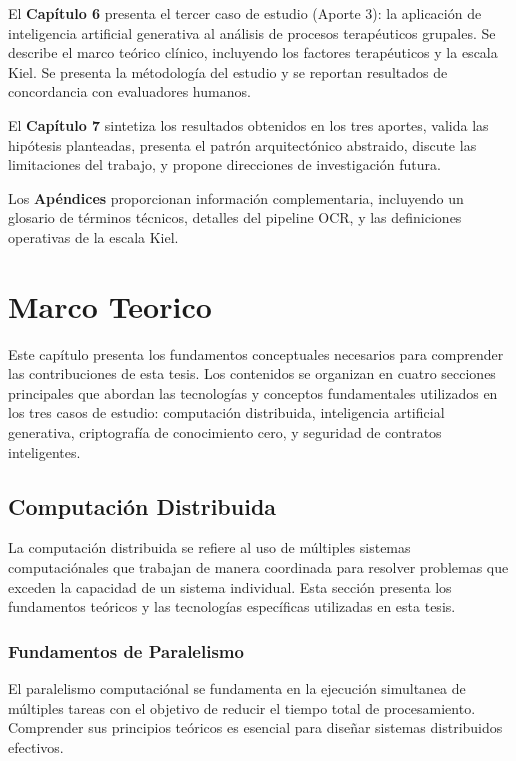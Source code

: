 \documentclass[12pt,a4paper,twoside]{book}
\begin{document}
El \textbf{Capítulo 6} presenta el tercer caso de estudio (Aporte 3): la aplicación de inteligencia artificial generativa al análisis de procesos terapéuticos grupales. Se describe el marco teórico clínico, incluyendo los factores terapéuticos y la escala Kiel. Se presenta la métodología del estudio y se reportan resultados de concordancia con evaluadores humanos.

El \textbf{Capítulo 7} sintetiza los resultados obtenidos en los tres aportes, valida las hipótesis planteadas, presenta el patrón arquitectónico abstraido, discute las limitaciones del trabajo, y propone direcciones de investigación futura.

Los \textbf{Apéndices} proporcionan información complementaria, incluyendo un glosario de términos técnicos, detalles del pipeline OCR, y las definiciones operativas de la escala Kiel.


\chapter{Marco Teorico}
\label{cap:marco_teórico}

Este capítulo presenta los fundamentos conceptuales necesarios para comprender las contribuciones de esta tesis. Los contenidos se organizan en cuatro secciones principales que abordan las tecnologías y conceptos fundamentales utilizados en los tres casos de estudio: computación distribuida, inteligencia artificial generativa, criptografía de conocimiento cero, y seguridad de contratos inteligentes.

\section{Computación Distribuida}

La computación distribuida se refiere al uso de múltiples sistemas computaciónales que trabajan de manera coordinada para resolver problemas que exceden la capacidad de un sistema individual. Esta sección presenta los fundamentos teóricos y las tecnologías específicas utilizadas en esta tesis.

\subsection{Fundamentos de Paralelismo}

El paralelismo computaciónal se fundamenta en la ejecución simultanea de múltiples tareas con el objetivo de reducir el tiempo total de procesamiento. Comprender sus principios teóricos es esencial para diseñar sistemas distribuidos efectivos.
\end{document}
